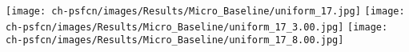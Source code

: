 \texttt{[image: ch-psfcn/images/Results/Micro\_Baseline/uniform\_17.jpg]}
\texttt{[image: ch-psfcn/images/Results/Micro\_Baseline/uniform\_17\_3.00.jpg]}
\texttt{[image: ch-psfcn/images/Results/Micro\_Baseline/uniform\_17\_8.00.jpg]}
\\
\vspace{-0.2em}
\\
